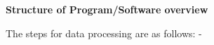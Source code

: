 \textbf{Structure of Program/Software overview} 

The steps for data processing are as follows:
- 


    
    
    
    
    
    
    
    
    
    
    
    
    
    
    
  